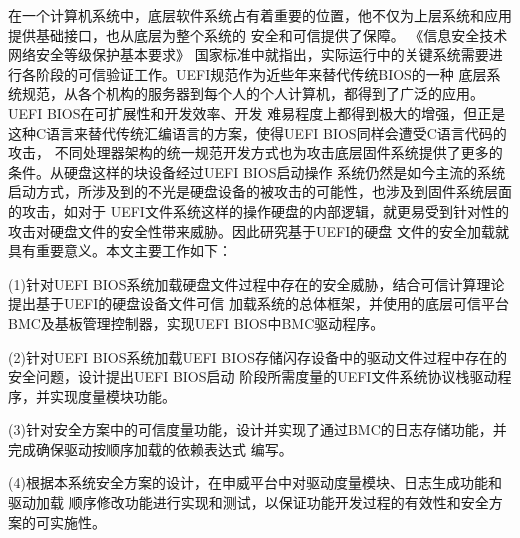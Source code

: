 \begin{cabstract}

在一个计算机系统中，底层软件系统占有着重要的位置，他不仅为上层系统和应用提供基础接口，也从底层为整个系统的
安全和可信提供了保障。
《信息安全技术 网络安全等级保护基本要求》
国家标准中就指出，实际运行中的关键系统需要进行各阶段的可信验证工作。UEFI规范作为近些年来替代传统BIOS的一种
底层系统规范，从各个机构的服务器到每个人的个人计算机，都得到了广泛的应用。UEFI BIOS在可扩展性和开发效率、开发
难易程度上都得到极大的增强，但正是这种C语言来替代传统汇编语言的方案，使得UEFI BIOS同样会遭受C语言代码的攻击，
不同处理器架构的统一规范开发方式也为攻击底层固件系统提供了更多的条件。从硬盘这样的块设备经过UEFI BIOS启动操作
系统仍然是如今主流的系统启动方式，所涉及到的不光是硬盘设备的被攻击的可能性，也涉及到固件系统层面的攻击，如对于
UEFI文件系统这样的操作硬盘的内部逻辑，就更易受到针对性的攻击对硬盘文件的安全性带来威胁。因此研究基于UEFI的硬盘
文件的安全加载就具有重要意义。本文主要工作如下：

\par (1)针对UEFI BIOS系统加载硬盘文件过程中存在的安全威胁，结合可信计算理论提出基于UEFI的硬盘设备文件可信
加载系统的总体框架，并使用的底层可信平台BMC及基板管理控制器，实现UEFI BIOS中BMC驱动程序。
\par (2)针对UEFI BIOS系统加载UEFI BIOS存储闪存设备中的驱动文件过程中存在的安全问题，设计提出UEFI BIOS启动
阶段所需度量的UEFI文件系统协议栈驱动程序，并实现度量模块功能。
\par (3)针对安全方案中的可信度量功能，设计并实现了通过BMC的日志存储功能，并完成确保驱动按顺序加载的依赖表达式
编写。
\par (4)根据本系统安全方案的设计，在申威平台中对驱动度量模块、日志生成功能和驱动加载
顺序修改功能进行实现和测试，以保证功能开发过程的有效性和安全方案的可实施性。

\end{cabstract}

